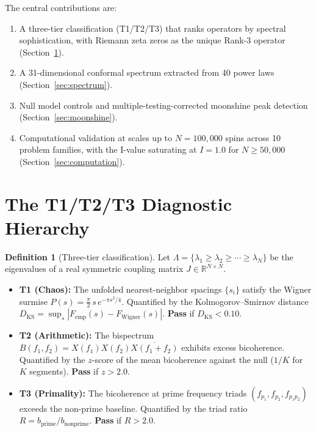 \documentclass[11pt]{amsart}
\theoremstyle{definition}
\newtheorem{definition}[theorem]{Definition}
\begin{document}
The central contributions are:
\begin{enumerate}[label=(\arabic*)]
\item A three-tier classification (T1/T2/T3) that ranks operators by spectral sophistication, with Riemann zeta zeros as the unique Rank-3 operator (Section~\ref{sec:hierarchy}).
\item A 31-dimensional conformal spectrum extracted from 40 power laws (Section~\ref{sec:spectrum}).
\item Null model controls and multiple-testing-corrected moonshine peak detection (Section~\ref{sec:moonshine}).
\item Computational validation at scales up to $N = 100{,}000$ spins across 10 problem families, with the I-value saturating at $I = 1.0$ for $N \geq 50{,}000$ (Section~\ref{sec:computation}).
\end{enumerate}


\section{The T1/T2/T3 Diagnostic Hierarchy}
\label{sec:hierarchy}

\begin{definition}[Three-tier classification]
Let $\Lambda = \{\lambda_1 \geq \lambda_2 \geq \cdots \geq \lambda_N\}$ be the eigenvalues of a real symmetric coupling matrix $J \in \mathbb{R}^{N \times N}$.

\begin{itemize}
\item \textbf{T1 (Chaos):} The unfolded nearest-neighbor spacings $\{s_i\}$ satisfy the Wigner surmise $P(s) = \frac{\pi}{2}\, s\, e^{-\pi s^2/4}$. Quantified by the Kolmogorov--Smirnov distance $D_{\mathrm{KS}} = \sup_s |F_{\mathrm{emp}}(s) - F_{\mathrm{Wigner}}(s)|$. \textbf{Pass} if $D_{\mathrm{KS}} < 0.10$.

\item \textbf{T2 (Arithmetic):} The bispectrum $B(f_1, f_2) = X(f_1) X(f_2) \overline{X(f_1 + f_2)}$ exhibits excess bicoherence. Quantified by the $z$-score of the mean bicoherence against the null ($1/K$ for $K$ segments). \textbf{Pass} if $z > 2.0$.

\item \textbf{T3 (Primality):} The bicoherence at prime frequency triads $(f_{p_1}, f_{p_2}, f_{p_1 p_2})$ exceeds the non-prime baseline. Quantified by the triad ratio $R = b_{\mathrm{prime}} / b_{\mathrm{nonprime}}$. \textbf{Pass} if $R > 2.0$.
\end{itemize}
\end{definition}
\end{document}
